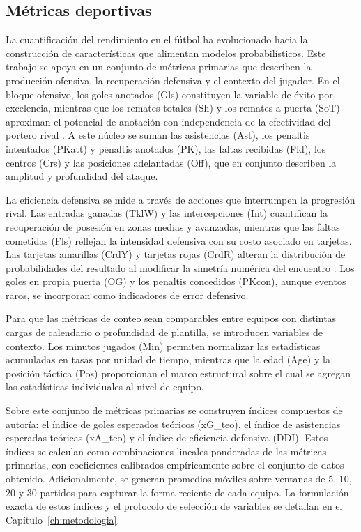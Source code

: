 \subsection{M\'etricas deportivas}

La cuantificaci\'on del rendimiento en el f\'utbol ha evolucionado hacia la construcci\'on de caracter\'isticas que alimentan modelos probabil\'isticos. Este trabajo se apoya en un conjunto de m\'etricas primarias que describen la producci\'on ofensiva, la recuperaci\'on defensiva y el contexto del jugador. En el bloque ofensivo, los goles anotados (Gls)  constituyen la variable de \'exito por excelencia, mientras que los remates totales (Sh) y los remates a puerta (SoT) aproximan el potencial de anotaci\'on con independencia de la efectividad del portero rival \cite{xG}. A este n\'ucleo se suman las asistencias (Ast), los penaltis intentados (PKatt) y penaltis anotados (PK), las faltas recibidas (Fld), los centros (Crs) y las posiciones adelantadas (Off), que en conjunto describen la amplitud y profundidad del ataque.

La eficiencia defensiva se mide a trav\'es de acciones que interrumpen la progresi\'on rival. Las entradas ganadas (TklW) y las intercepciones (Int) cuantifican la recuperaci\'on de posesi\'on en zonas medias y avanzadas, mientras que las faltas cometidas (Fls) reflejan la intensidad defensiva con su costo asociado en tarjetas. Las tarjetas amarillas (CrdY) y tarjetas rojas (CrdR) alteran la distribuci\'on de probabilidades del resultado al modificar la simetr\'ia num\'erica del encuentro \cite{Iskandaryan2020}. Los goles en propia puerta (OG) y los penaltis concedidos (PKcon), aunque eventos raros, se incorporan como indicadores de error defensivo.

Para que las m\'etricas de conteo sean comparables entre equipos con distintas cargas de calendario o profundidad de plantilla, se introducen variables de contexto. Los minutos jugados (Min) permiten normalizar las estad\'isticas acumuladas en tasas por unidad de tiempo, mientras que la edad (Age) y la posici\'on t\'actica (Pos) proporcionan el marco estructural sobre el cual se agregan las estad\'isticas individuales al nivel de equipo.

Sobre este conjunto de m\'etricas primarias se construyen \'indices compuestos de autor\'ia: el \'indice de goles esperados te\'oricos (xG\_teo), el \'indice de asistencias esperadas te\'oricas (xA\_teo) y el \'indice de eficiencia defensiva (DDI). Estos \'indices se calculan como combinaciones lineales ponderadas de las m\'etricas primarias, con coeficientes calibrados emp\'iricamente sobre el conjunto de datos obtenido. Adicionalmente, se generan promedios m\'oviles sobre ventanas de 5, 10, 20 y 30 partidos para capturar la forma reciente de cada equipo. La formulaci\'on exacta de estos \'indices y el protocolo de selecci\'on de variables se detallan en el Cap\'itulo~\ref{ch:metodologia}.

